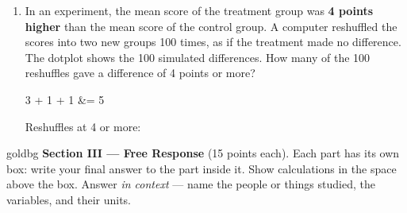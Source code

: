 \documentclass[12pt]{article}
\begin{document}
\begin{enumerate}[leftmargin=1.9em, itemsep=0.16in, resume]
  \boxguard[20]
  \item In an experiment, the mean score of the treatment group was \textbf{4 points higher}
        than the mean score of the control group. A computer reshuffled the scores into two new
        groups 100 times, as if the treatment made no difference. The dotplot shows the 100
        simulated differences. How many of the 100 reshuffles gave a difference of 4 points or
        more?
        \begin{center}
        \end{center}
        \vspace{-6pt}
        \begin{work}
          3 + 1 + 1 &= 5
        \end{work}
        \hfill Reshuffles at 4 or more:~\gradedblank[id=t25, type=short, points=3, answer=5, check=numeric]{1.1in}{0.34in}

\end{enumerate}

\vspace{0.14in}

\boxguard[34]
\begin{headlinebox}{goldbg}
\small
\textbf{Section III --- Free Response} (15 points each). Each part has its own box: write your
final answer to the part inside it. Show calculations in the space above the box. Answer
\emph{in context} --- name the people or things studied, the variables, and their units.
\end{headlinebox}

\vspace{0.10in}
\end{document}
